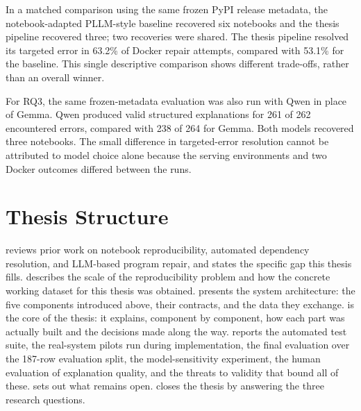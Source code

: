 In a matched comparison using the same frozen PyPI release metadata, the
notebook-adapted PLLM-style baseline recovered six notebooks and the thesis
pipeline recovered three; two recoveries were shared. The thesis pipeline
resolved its targeted error in 63.2\% of Docker repair attempts, compared
with 53.1\% for the baseline. This single descriptive comparison shows
different trade-offs, rather than an overall winner.

For RQ3, the same frozen-metadata evaluation was also run with Qwen in place
of Gemma. Qwen produced valid structured explanations for 261 of 262
encountered errors, compared with 238 of 264 for Gemma. Both models recovered
three notebooks. The small difference in targeted-error resolution cannot be
attributed to model choice alone because the serving environments and two
Docker outcomes differed between the runs.

\section{Thesis Structure}
\label{sec:intro-structure}

 reviews prior work on notebook reproducibility,
automated dependency resolution, and LLM-based program repair, and states
the specific gap this thesis fills.  describes the
scale of the reproducibility problem and how the concrete working dataset for
this thesis was obtained.  presents the system
architecture: the five components introduced above, their contracts, and the
data they exchange.  is the core of the thesis: it
explains, component by component, how each part was actually built and the
decisions made along the way.  reports the automated
test suite, the real-system pilots run during implementation, the final
evaluation over the 187-row evaluation split, the model-sensitivity
experiment, the human evaluation of explanation quality, and the threats to
validity that bound all of these.  sets out what
remains open.  closes the thesis by answering the
three research questions.
